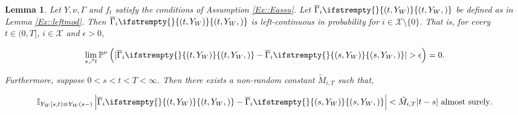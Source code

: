 \documentclass[12pt]{article}
\newcommand{\mb}{\mathbb}
\newcommand{\mc}{\mathcal}
\newcommand{\ov}{\overline}
\newcommand{\te}{\text}
\newcommand{\ep}{\epsilon}
\newcommand{\pr}{\mb{P}}							%
\newcommand{\sta}{\mc{X}}							%
\newcommand{\vind}[1]{_{#1}}						%
\newcommand{\tme}[1]{(#1)}							%
\newcommand{\tmi}[1]{#1}							%
\newcommand{\stpara}[1]{_{#1}}						%
\newcommand{\tmepro}[3]{
\ifstrempty{#3}{
	(#1,#2)}{
	(#1,#2,#3)}}									%
\newcommand{\Xg}{Y}									%
\newcommand{\alt}[1]{\tilde{#1}}					%
\newcommand{\ratee}{\Gamma}							%
\newcommand{\grate}{\ov{\ratee}}					%
\newcommand{\mm}{\nu}								%
\newcommand{\const}{M}								%
\newcommand{\sttpara}[2]{_{#1,#2}}					%
\newcommand{\mpara}[1]{^{#1}}						%
\newtheorem{lem}[thms]{Lemma}
\begin{document}
\begin{lem}
Let \(\Xg,\mm,\ratee\) and \(f_t\) satisfy the conditions of Assumption \ref{Ex::Eassu}. Let \(\grate\stpara{i}\tmepro{t}{\Xg\vind{W}}{}\) be defined as in Lemma \ref{Ex::leftmod}. Then \(\grate\stpara{i}\tmepro{t}{\Xg\vind{W}}{}\) is left-continuous in probability for \(i \in \sta\setminus\{0\}\). That is, for every \(t \in (0,T]\), \(i \in \sta\) and \(\ep > 0\),

\[\lim_{s \nearrow t}\pr\mpara{\mm}\left(|\grate\stpara{i}\tmepro{t}{\Xg\vind{W}}{}- \grate\stpara{i}\tmepro{s}{\Xg\vind{W}}{}| > \ep\right) = 0.\]
\label{Ex::pleft}

Furthermore, suppose \(0 < s < t < T < \infty\). Then there exists a non-random constant \(\alt{\const}\sttpara{i}{T}\) such that,

\[\mb{I}_{\Xg\vind{W}\tmi{[s,t)} \equiv \Xg\vind{W}\tme{s-}}\left|\grate\stpara{i}\tmepro{t}{\Xg\vind{W}}{}- \grate\stpara{i}\tmepro{s}{\Xg\vind{W}}{}\right| < \alt{\const}\sttpara{i}{T}|t-s| \te{ almost surely}.\]
\end{lem}
\end{document}
